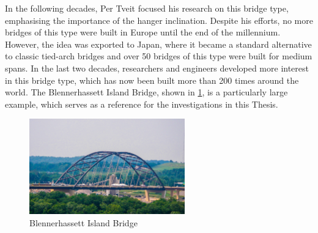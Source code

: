 In the following decades, Per Tveit focused his research on this bridge type, emphasising the importance of the hanger inclination. Despite his efforts, no more bridges of this type were built in Europe until the end of the millennium. However, the idea was exported to Japan, where it became a standard alternative to classic tied-arch bridges and over 50 bridges of this type were built for medium spans. In the last two decades, researchers and engineers developed more interest in this bridge type, which has now been built more than 200 times around the world. The Blennerhassett Island Bridge, shown in \cref{fig:Blennerhassett}, is a particularly large example, which serves as a reference for the investigations in this Thesis.

\begin{figure}[H]
    \centering
    \includegraphics[width=0.6\textwidth]{overleaf/Pictures/Blennerhassett.jpg}
    \caption{Blennerhassett Island Bridge \cite{Blennerhassett}}
    \label{fig:Blennerhassett}
\end{figure}


